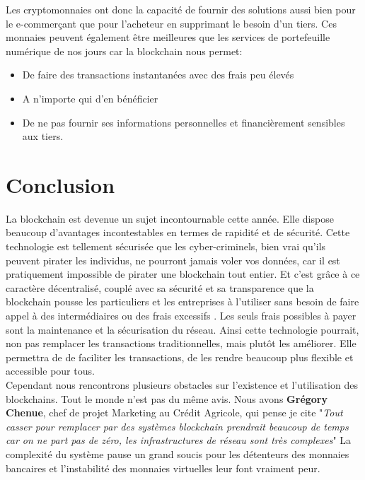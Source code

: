 \documentclass[12pt]{report}
\begin{document}
\hspace{1cm} Les cryptomonnaies ont donc la capacité de fournir des solutions aussi bien pour le e-commerçant que pour l'acheteur en supprimant  le besoin d'un tiers. Ces monnaies peuvent également être meilleures que les services de portefeuille numérique de nos jours car la blockchain nous permet: 
    \begin{itemize}
        \item De faire des transactions instantanées avec des frais peu élevés
        \item A n’importe qui d'en bénéficier
        \item De ne pas fournir ses informations personnelles et financièrement sensibles aux tiers.
    \end{itemize}

\newpage		
\section{Conclusion}

\hspace{1cm} La blockchain est devenue un sujet incontournable cette année. Elle dispose beaucoup d'avantages incontestables en termes de rapidité et de sécurité. Cette technologie est tellement sécurisée que les cyber-criminels, bien vrai qu'ils peuvent pirater les individus, ne pourront jamais  voler vos données, car il est pratiquement impossible de pirater une blockchain tout entier. Et c'est grâce à ce caractère décentralisé, couplé avec sa sécurité et sa transparence que la blockchain pousse les particuliers et les entreprises à l'utiliser sans besoin de faire appel à des intermédiaires ou des frais excessifs . Les seuls frais possibles à payer sont la maintenance et la sécurisation du réseau. Ainsi cette technologie pourrait, non pas remplacer les transactions traditionnelles, mais plutôt les améliorer. Elle permettra de de faciliter les transactions, de les rendre beaucoup plus flexible et accessible pour tous. \\ 

\hspace{1cm} Cependant nous rencontrons plusieurs obstacles sur l'existence et l'utilisation des blockchains. Tout le monde n'est pas du même avis. Nous avons \textbf{Grégory Chenue}, chef de projet Marketing au Crédit Agricole, qui pense je cite "\textit{Tout casser pour remplacer par des systèmes blockchain prendrait beaucoup de temps car on ne part pas de zéro, les infrastructures de réseau sont très complexes}" La complexité du système pause un grand soucis pour les détenteurs des monnaies bancaires et l'instabilité des monnaies virtuelles leur font vraiment peur. \\
\end{document}
